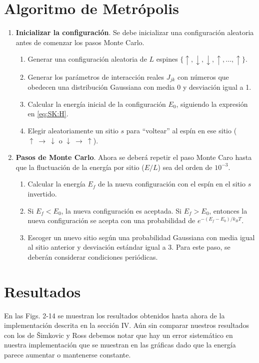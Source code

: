 \documentclass[letterpaper,superscriptaddress,aps,pra,nolongbibliography,twocolumn,showpacs,floatfix,10pt]{revtex4-2} %
\renewcommand{\>}{\rangle}
\newcommand{\<}{\langle}
\newcommand{\syr}{Šimkovic y Ross}
\begin{document}
\section{Algoritmo de Metrópolis}
\begin{enumerate}
\item \textbf{Inicializar la configuración}. Se debe inicializar una 
configuración aleatoria antes de comenzar los pasos Monte Carlo.
\begin{enumerate}
\item Generar una configuración aleatoria de $L$ espines $\{ \uparrow,
\downarrow,\downarrow,\uparrow,\ldots,\uparrow\}$.
\item Generar los parámetros de interacción reales $J_{jk}$ con números que 
obedecen una distribución Gaussiana con media 0 y desviación igual a 1.
\item Calcular la energía inicial de la configuración $E_0$, siguiendo
la expresión en \eqref{eq:SK:H}.
\item Elegir aleatoriamente un sitio $s$ para ``voltear'' al espín en 
ese sitio ($\uparrow\ \to\ \downarrow$ o $\downarrow\ \to\ \uparrow$).
\end{enumerate}
\item \textbf{Pasos de Monte Carlo}. Ahora se deberá repetir el paso Monte
Caro hasta que la fluctuación de la energía por sitio ($E/L$) 
sea del orden de $10^{-3}$.
\begin{enumerate}
\item Calcular la energía $E_f$ de la nueva configuración con el espín en el
sitio $s$ invertido.
\item Si $E_f<E_0$, la nueva configuración es aceptada. Si $E_f>E_0$,
entonces la nueva configuración se acepta con una probabilidad de $e^{-(E_f-E_0)/k_BT}$.
\item Escoger un nuevo sitio según una probabilidad Gaussiana con media
igual al sitio anterior y desviación estándar igual a $3$.
Para este paso, se deberán considerar condiciones periódicas.
\end{enumerate}
\end{enumerate}

\section{Resultados}
En las Figs. 2-14 se muestran los resultados obtenidos hasta 
ahora de la implementación descrita en la sección IV. Aún sin comparar
nuestros resultados con los de \syr{} debemos notar que hay un error 
sistemático en nuestra implementación que se muestran en las gráficas dado 
que la energía parece aumentar o mantenerse constante.
\end{document}
